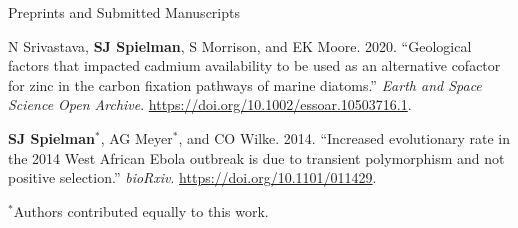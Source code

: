 \documentclass{resume} %
\begin{document}
\vspace*{0.35cm}
\begin{rSection}{Preprints and Submitted Manuscripts}
\vspace*{0.25cm}

\begin{etaremune}[leftmargin=1.5em]

\item N Srivastava, \textbf{SJ Spielman}, S Morrison, and EK Moore. 2020. ``Geological factors that impacted cadmium availability to be used as an alternative cofactor for zinc in the carbon fixation pathways of marine diatoms.''  \emph{Earth and Space Science Open Archive}. \url{https://doi.org/10.1002/essoar.10503716.1}.

\item \textbf{SJ Spielman}$^\ast$, AG Meyer$^\ast$, and CO Wilke. 2014. ``Increased evolutionary rate in the 2014 West African Ebola outbreak is due to transient polymorphism and not positive selection.'' \emph{bioRxiv}. \url{https://doi.org/10.1101/011429}.

\end{etaremune}


$^\ast$Authors contributed equally to this work.
\end{rSection}



\end{document}
